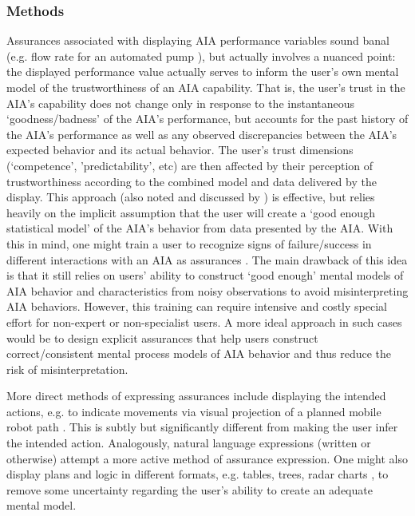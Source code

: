 \subsubsection{Methods}
Assurances associated with displaying AIA performance variables sound banal (e.g. flow rate for an automated pump \cite{Muir1996-gt}), but actually involves a nuanced point: the displayed performance value actually serves to inform the user's own mental model of the trustworthiness of an AIA capability. That is, the user's trust in the AIA's capability does not change only in response to the instantaneous `goodness/badness' of the AIA's performance, but accounts for the past history of the AIA's performance as well as any observed discrepancies between the AIA's expected behavior and its actual behavior.  
The user's trust dimensions (`competence', 'predictability', etc) are then affected by their perception of trustworthiness according to the combined model and data delivered by the display. 
This approach (also noted and discussed by \cite{Wickens1999-la,Sheridan1984-kx,Hutchins2015-if}) is effective, but relies heavily on the implicit assumption that the user will create a `good enough statistical model' of the AIA's behavior from data presented by the AIA. With this in mind, one might train a user to recognize signs of failure/success in different interactions with an AIA as assurances \cite{Freedy2007-sg,Desai2012-rc,Salem2015-md}. 
The main drawback of this idea is that it still relies on users' ability to construct `good enough' mental models of AIA behavior and characteristics from noisy observations to avoid misinterpreting AIA behaviors. 
However, this training can require intensive and costly special effort for non-expert or non-specialist users. 
A more ideal approach in such cases would be to design explicit assurances that help users construct correct/consistent mental process models of AIA behavior and thus reduce the risk of misinterpretation.

More direct methods of expressing assurances include displaying the intended actions, e.g. to indicate movements via visual projection of a planned mobile robot path \cite{Chadalavada2015-wx}. This is subtly but significantly different from making the user infer the intended action. Analogously, natural language expressions (written or otherwise) attempt a more active method of assurance expression. One might also display plans and logic in different formats, e.g. tables, trees, radar charts  \cite{Van_Belle2013-ph, Huysmans2011-th, Hutchins2015-if}, to remove some uncertainty regarding the user's ability to create an adequate mental model. %

